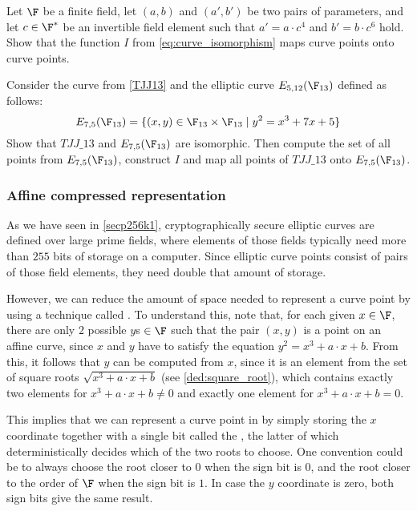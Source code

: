 \begin{exercise}
Let $\F$ be a finite field, let $(a,b)$ and $(a',b')$ be two pairs of parameters, and let $c\in \F^*$ be an invertible field element such that $a' = a\cdot c^4$ and $b' = b\cdot c^6$ hold. Show that the function $I$ from \eqref{eq:curve_isomorphism} maps curve points onto curve points.
\end{exercise}

\begin{exercise}
\label{ex:isomorphic_TJJ13} Consider the  curve from \examplename{} \ref{TJJ13} and the elliptic curve $E_{5,12}(\F_{13})$ defined as follows:
\begin{equation}
E_{7,5}(\F_{13}) = \{ (x,y)\in \F_{13}\times \F_{13}\;|\; y^2 = x^3 + 7x +5\}
\end{equation}
Show that $TJJ\_13$ and $E_{7,5}(\F_{13})$ are isomorphic. Then compute the set of all points from $E_{7,5}(\F_{13})$, construct $I$ and map all points of $TJJ\_13$ onto $E_{7,5}(\F_{13})$.
\end{exercise}

\subsubsection{Affine compressed representation}
\label{sec:affine_point_compression}
As we have seen in \examplename{} \ref{secp256k1}, cryptographically secure elliptic curves are defined over large prime fields, where elements of those fields typically need more than $255$ bits of storage on a computer. Since elliptic curve points consist of pairs of those field elements, they need double that amount of storage.

However, we can reduce the amount of space needed to represent a curve point by using a technique called . To understand this, note that, for each given $x\in\F$, there are only $2$ possible $y$s $\in \F$ such that the pair $(x,y)$ is a point on an affine  curve, since $x$ and $y$ have to satisfy the equation $y^2 = x^3 + a\cdot x + b$. From this, it follows that $y$ can be computed from $x$, since it is an element from the set of square roots $\sqrt{x^3 + a\cdot x +b}$ (see \ref{ded:square_root}), which contains exactly two elements for $x^3 + a\cdot x +b\neq 0$ and exactly one element for $x^3 + a\cdot x +b=0$. 

This implies that we can represent a curve point in  by simply storing the $x$ coordinate together with a single bit called the , the latter of which deterministically decides which of the two roots to choose. One convention could be to always choose the root closer to $0$ when the sign bit is $0$, and the root closer to the order of $\F$ when the sign bit is $1$. In case the $y$ coordinate is zero, both sign bits give the same result.

